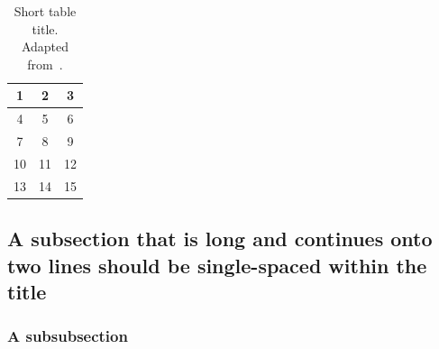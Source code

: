      
\begin{table}[H] %
    \vspace{0mm} %
    \caption[Short table title (customized for LoT; full title in body text)]{Short table title. Adapted from~\cite[table 5]{congress_1991}.} %
    \begin{center}
    \begin{tabular}{ c c c }
    \hline
      1 & 2 & 3 \\ \hline
      4 & 5 & 6 \\
      7 & 8 & 9 \\
      10 & 11 & 12 \\
      13 & 14 & 15 \\
    \hline
    \end{tabular}
    \end{center}
    \label{table:sample}
\end{table}


\lipsum[2]


\subsection{A subsection that is long and continues onto two lines should be single-spaced within the title}\label{sec:another}
\lipsum[3]


\subsubsection{A subsubsection}\label{sec:minorstuff}
\lipsum[4]


